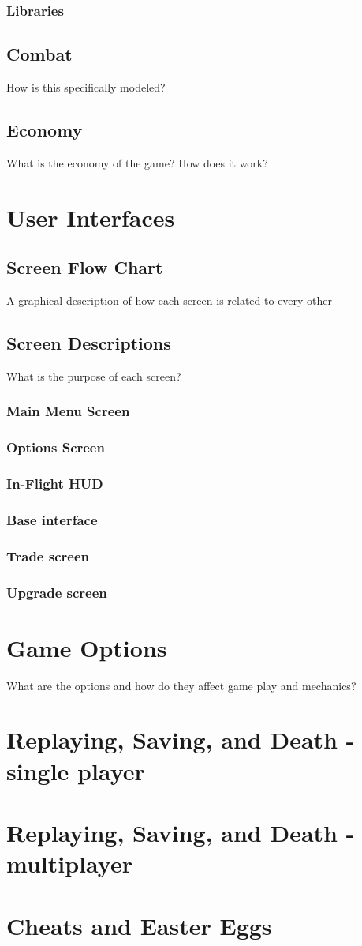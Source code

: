 \subsubsection{Libraries}
\subsection{Combat}
How is this specifically modeled?
\subsection{Economy}  
What is the economy of the game? How does it work?
\section{User Interfaces}
\subsection{Screen Flow Chart}
A graphical description of how each screen is related to every other
\subsection{Screen Descriptions}
What is the purpose of each screen?
\subsubsection{Main Menu Screen}
\subsubsection{Options Screen}
\subsubsection{In-Flight HUD}
\subsubsection{Base interface}
\subsubsection{Trade screen}
\subsubsection{Upgrade screen}
\section{Game Options}
  What are the options and how do they affect game play and mechanics?
\section{Replaying, Saving, and Death - single player}
\section{Replaying, Saving, and Death - multiplayer}
\section{Cheats and Easter Eggs}
